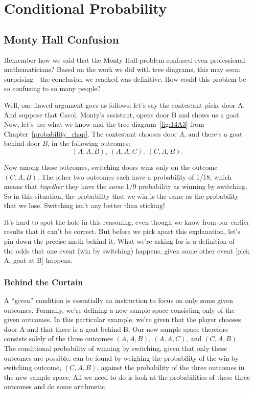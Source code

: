 \chapter{Conditional Probability}\label{chap:cond_prob} %

\section{Monty Hall Confusion}\label{sec:confuse_Monty}
Remember how we said that the Monty Hall problem confused even
professional mathematicians?  Based on the work we did with tree
diagrams, this may seem surprising---the conclusion we reached was
definitive.  How could this problem be so confusing to so many
people?

Well, one flawed argument goes as follows: let's say the contestant picks
door A.  And suppose that Carol, Monty's assistant, opens door B and
shows us a goat.  Now, let's use what we know and the tree
diagram~\ref{fig:14A3} from Chapter~\ref{probability_chap}.  The
contestant chooses door $A$, and there's a goat behind door $B$, in
the following outcomes:
\[
(A, A, B),\ (A, A, C),\ (C, A, B).
\]

Now among those outcomes, switching doors wins only on the outcome
$(C, A, B)$.  The other two outcomes each have a probability of 1/18,
which means that \emph{together} they have the \emph{same} 1/9
probability as winning by switching.  So in this situation, the
probability that we win is the same as the probability that we lose.
Switching isn't any better than sticking!

It's hard to spot the hole in this reasoning, even though we know from
our earlier results that it can't be correct.  But before we pick
apart this explanation, let's pin down the precise math behind it.
What we're asking for is a definition of ---the odds that one event (win by switching) happens,
given some other event [pick A, goat at B] happens.

\subsection{Behind the Curtain}

A ``given'' condition is essentially an instruction to focus on only
some given outcomes.  Formally, we're defining a new sample space
consisting only of the given outcomes.  In this particular example,
we're given that the player chooses door A and that there is a goat
behind B.  Our new sample space therefore consists solely of the three
outcomes $(A, A, B)$, $(A, A, C)$, and $(C, A, B)$.  The conditional
probability of winning by switching, given that only these outcomes
are possible, can be found by weighing the probability of the
win-by-switching outcome, $(C, A, B)$, against the probability of the
three outcomes in the new sample space.  All we need to do is look at
the probabilities of these three outcomes and do some arithmetic.

